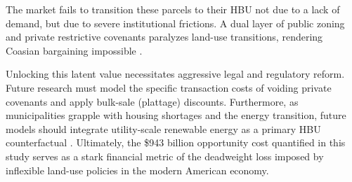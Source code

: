 \documentclass[10pt, letterpaper]{article}
\begin{document}
The market fails to transition these parcels to their HBU not due to a lack of demand, but due to severe institutional frictions. A dual layer of public zoning and private restrictive covenants paralyzes land-use transitions, rendering Coasian bargaining impossible \parencite{Coase1960, Ellickson2022, Korngold2024}.

Unlocking this latent value necessitates aggressive legal and regulatory reform. Future research must model the specific transaction costs of voiding private covenants and apply bulk-sale (plattage) discounts. Furthermore, as municipalities grapple with housing shortages and the energy transition, future models should integrate utility-scale renewable energy as a primary HBU counterfactual \parencite{Weinand2025}. Ultimately, the \$943 billion opportunity cost quantified in this study serves as a stark financial metric of the deadweight loss imposed by inflexible land-use policies in the modern American economy.

\newpage

\printbibliography[title={References}]
\end{document}
